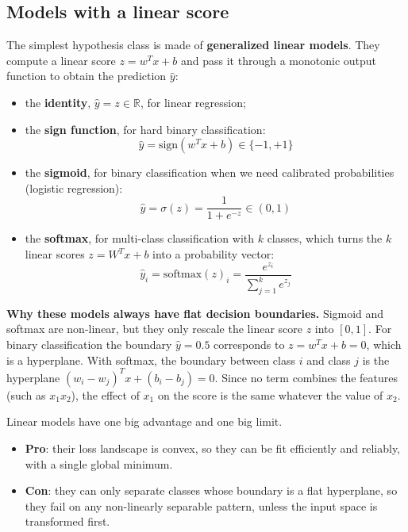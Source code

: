 \subsection{Models with a linear score}
\label{sec:linear-score}
The simplest hypothesis class is made of \textbf{generalized linear models}. They
compute a linear score $z = w^T x + b$ and pass it through a monotonic output
function to obtain the prediction $\hat{y}$:
\begin{itemize}
    \item the \textbf{identity}, $\hat{y} = z \in \mathbb{R}$, for linear regression;
    \item the \textbf{sign function}, for hard binary classification:
          \begin{equation}
              \hat{y} = \text{sign}(w^T x + b) \in \{-1, +1\}
          \end{equation}
    \item the \textbf{sigmoid}, for binary classification when we need calibrated
          probabilities (logistic regression):
          \begin{equation}
              \hat{y} = \sigma(z) = \frac{1}{1+e^{-z}} \in (0, 1)
          \end{equation}
    \item the \textbf{softmax}, for multi-class classification with $k$ classes,
          which turns the $k$ linear scores $z = W^T x + b$ into a probability
          vector:
          \begin{equation}
              \hat{y}_i = \text{softmax}(z)_i = \frac{e^{z_i}}{\sum_{j=1}^k e^{z_j}}
          \end{equation}
\end{itemize}

\begin{note}
    \textbf{Why these models always have flat decision boundaries.} Sigmoid and
    softmax are non-linear, but they only rescale the linear score $z$ into
    $[0,1]$. For binary classification the boundary $\hat{y} = 0.5$ corresponds to
    $z = w^T x + b = 0$, which is a hyperplane. With softmax, the boundary between
    class $i$ and class $j$ is the hyperplane $(w_i - w_j)^T x + (b_i - b_j) = 0$.
    Since no term combines the features (such as $x_1 x_2$), the effect of $x_1$ on
    the score is the same whatever the value of $x_2$.
\end{note}

Linear models have one big advantage and one big limit.
\begin{itemize}
    \item \textbf{Pro}: their loss landscape is convex, so they can be fit
          efficiently and reliably, with a single global minimum.
    \item \textbf{Con}: they can only separate classes whose boundary is a flat
          hyperplane, so they fail on any non-linearly separable pattern, unless
          the input space is transformed first.
\end{itemize}

